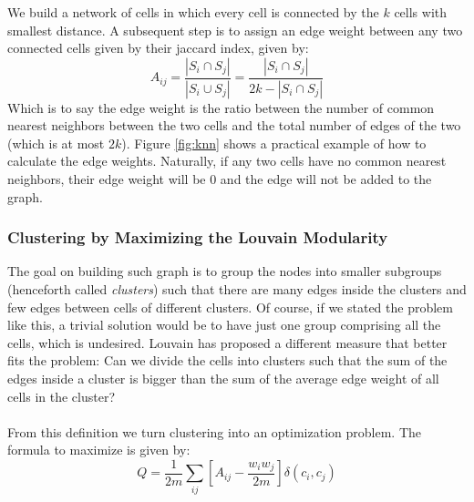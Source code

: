 We build a network of cells in which every cell is connected by the $k$ cells with smallest distance. A subsequent step is to assign an edge weight between any two connected cells given by their jaccard index, given by:
$$
A_{ij} = \frac{|S_i \cap S_j|}{|S_i \cup S_j|} = \frac{|S_i \cap S_j|}{2k - |S_i \cap S_j |}
$$
Which is to say the edge weight is the ratio between the number of common nearest neighbors between the two cells and the total number of edges of the two (which is at most $2k$). Figure \ref{fig:knn} shows a practical example of how to calculate the edge weights. Naturally, if any two cells have no common nearest neighbors, their edge weight will be 0 and the edge will not be added to the graph. 


\subsubsection{Clustering by Maximizing the Louvain Modularity}
The goal on building such graph is to group the nodes into smaller subgroups (henceforth called \emph{clusters}) such that there are many edges inside the clusters and few edges between cells of different clusters. Of course, if we stated the problem like this, a trivial solution would be to have just one group comprising all the cells, which is undesired. Louvain has proposed a different measure that better fits the problem: Can we divide the cells into clusters such that the sum of the edges inside a cluster is bigger than the sum of the average edge weight of all cells in the cluster? \\
\\
From this definition we turn clustering into an optimization problem. The formula to maximize is given by:
$$
Q = \frac{1}{2m}\sum_{ij} \left[ A_{ij} - \frac{w_i w_j}{2m} \right]\delta(c_i, c_j)
$$
\\

